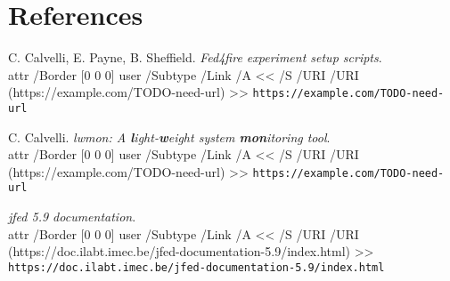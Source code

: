 \documentclass[a4paper,12pt]{article}
\newcommand{\url}[1]{%
\pdfstartlink %
attr {/Border [0 0 0]} %
user {/Subtype /Link /A << /S /URI /URI (#1) >>}%
{\tt #1}\pdfendlink}
\newcommand{\url}[1]{{\tt #1}}
\begin{document}
\section*{References}

\begin{thebibliography}{99}
\begin{sloppypar}

  C. Calvelli, E. Payne, B. Sheffield.
  {\em Fed4fire experiment setup scripts}.\\
  \url{https://example.com/TODO-need-url}

  C. Calvelli.
  {\em lwmon: A {\bf\em l}ight-{\bf\em w}eight system {\bf\em mon}itoring tool}.\\
  \url{https://example.com/TODO-need-url}

  {\em jfed 5.9 documentation}.\\
  \url{https://doc.ilabt.imec.be/jfed-documentation-5.9/index.html}

\end{sloppypar}
\end{thebibliography}
\end{document}
